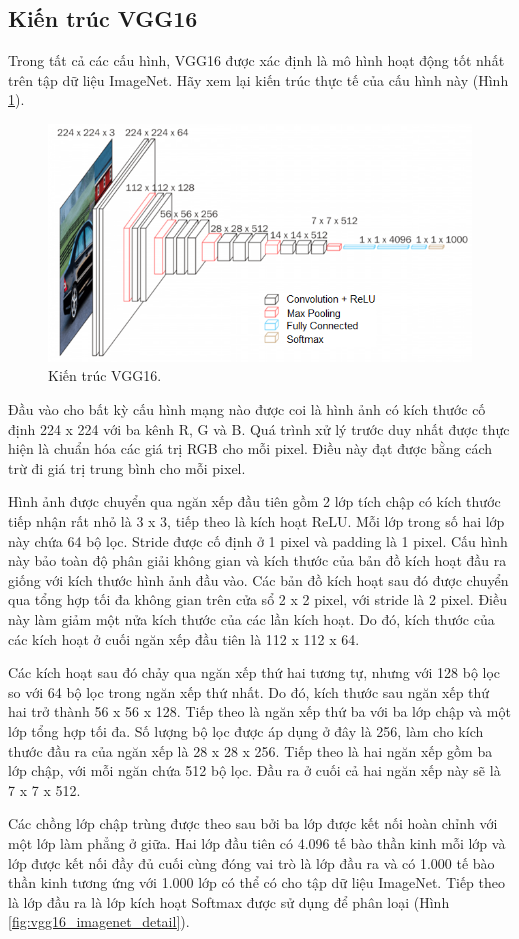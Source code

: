 \subsection{Kiến trúc VGG16}
Trong tất cả các cấu hình, VGG16 được xác định là mô hình hoạt động tốt nhất trên tập dữ liệu ImageNet. Hãy xem lại kiến trúc thực tế của cấu hình này (Hình \ref{fig:vgg16_imagenet}).
\begin{figure}[H]
	\centering
	\includegraphics[width=0.6\linewidth]{images/vgg16_imagenet}
	\caption{Kiến trúc VGG16.}
	\label{fig:vgg16_imagenet}
\end{figure}
Đầu vào cho bất kỳ cấu hình mạng nào được coi là hình ảnh có kích thước cố định 224 x 224 với ba kênh R, G và B. Quá trình xử lý trước duy nhất được thực hiện là chuẩn hóa các giá trị RGB cho mỗi pixel. Điều này đạt được bằng cách trừ đi giá trị trung bình cho mỗi pixel.

Hình ảnh được chuyển qua ngăn xếp đầu tiên gồm 2 lớp tích chập có kích thước tiếp nhận rất nhỏ là 3 x 3, tiếp theo là kích hoạt ReLU. Mỗi lớp trong số hai lớp này chứa 64 bộ lọc. Stride được cố định ở 1 pixel và padding là 1 pixel. Cấu hình này bảo toàn độ phân giải không gian và kích thước của bản đồ kích hoạt đầu ra giống với kích thước hình ảnh đầu vào. Các bản đồ kích hoạt sau đó được chuyển qua tổng hợp tối đa không gian trên cửa sổ 2 x 2 pixel, với stride là 2 pixel. Điều này làm giảm một nửa kích thước của các lần kích hoạt. Do đó, kích thước của các kích hoạt ở cuối ngăn xếp đầu tiên là 112 x 112 x 64.

Các kích hoạt sau đó chảy qua ngăn xếp thứ hai tương tự, nhưng với 128 bộ lọc so với 64 bộ lọc trong ngăn xếp thứ nhất. Do đó, kích thước sau ngăn xếp thứ hai trở thành 56 x 56 x 128. Tiếp theo là ngăn xếp thứ ba với ba lớp chập và một lớp tổng hợp tối đa. Số lượng bộ lọc được áp dụng ở đây là 256, làm cho kích thước đầu ra của ngăn xếp là 28 x 28 x 256. Tiếp theo là hai ngăn xếp gồm ba lớp chập, với mỗi ngăn chứa 512 bộ lọc. Đầu ra ở cuối cả hai ngăn xếp này sẽ là 7 x 7 x 512.

Các chồng lớp chập trùng được theo sau bởi ba lớp được kết nối hoàn chỉnh với một lớp làm phẳng ở giữa. Hai lớp đầu tiên có 4.096 tế bào thần kinh mỗi lớp và lớp được kết nối đầy đủ cuối cùng đóng vai trò là lớp đầu ra và có 1.000 tế bào thần kinh tương ứng với 1.000 lớp có thể có cho tập dữ liệu ImageNet. Tiếp theo là lớp đầu ra là lớp kích hoạt Softmax được sử dụng để phân loại (Hình \ref{fig:vgg16_imagenet_detail}).

